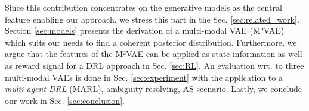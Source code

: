 \begin{confidential}
%
%
%
%
%
%
Since this contribution concentrates on the generative models as the central feature enabling our approach, we stress this part in the Sec. \ref{sec:related_work}.
%
Section \ref{sec:models} presents the derivation of a multi-modal VAE (M²VAE) which suits our needs to find a coherent posterior distribution.
%
Furthermore, we argue that the features of the M²VAE can be applied as state information as well as reward signal for a DRL approach in Sec. \ref{sec:RL}.
%
An evaluation wrt. to three multi-modal VAEs is done in Sec. \ref{sec:experiment} with the application to a \textit{multi-agent DRL} (MARL), ambiguity resolving, AS scenario.
%
Lastly, we conclude our work in Sec. \ref{sec:conclusion}.


\end{confidential}